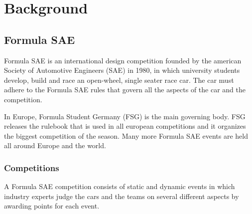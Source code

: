 \chapter{Background}

\section{Formula SAE}
Formula SAE is an international design competition founded by the american Society of Automotive Engineers (SAE) in 1980, in which university students develop, build and race an open-wheel, single seater race car. The car must adhere to the Formula SAE rules that govern all the aspects of the car and the competition.

In Europe, Formula Student Germany (FSG) is the main governing body. FSG releases the rulebook \cite{fsg2020} that is used in all european competitions and it organizes the biggest competition of the season. Many more Formula SAE events are held all around Europe and the world.

\subsection{Competitions}
A Formula SAE competition consists of static and dynamic events in which industry experts judge the cars and the teams on several different aspects by awarding points for each event.

